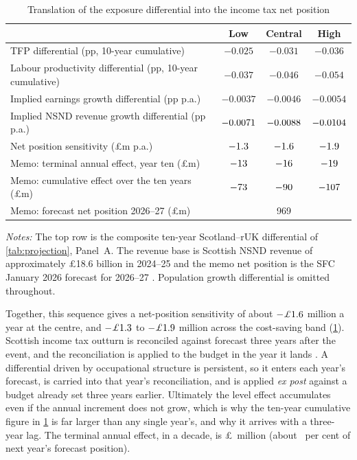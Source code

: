 \begin{table}[t]
\centering
\caption{Translation of the exposure differential into the income tax net position}
\label{tab:fiscal}
\small
\begin{tabular}{lccc}
\toprule
 & Low & Central & High \\
\midrule
TFP differential (pp, 10-year cumulative) &
  $-0.025$ & $-0.031$ & $-0.036$ \\
Labour productivity differential (pp, 10-year cumulative) &
  $-0.037$ & $-0.046$ & $-0.054$ \\
Implied earnings growth differential (pp p.a.) &
  $-0.0037$ & $-0.0046$ & $-0.0054$ \\
Implied NSND revenue growth differential (pp p.a.) &
  $-0.0071$ & $-0.0088$ & $-0.0104$ \\
Net position sensitivity (\pounds m p.a.) &
  $-1.3$ & $-1.6$ & $-1.9$ \\
Memo: terminal annual effect, year ten (\pounds m) &
  $-13$ & $-16$ & $-19$ \\
Memo: cumulative effect over the ten years (\pounds m) &
  $-73$ & $-90$ & $-107$ \\
Memo: forecast net position 2026--27 (\pounds m) &
  \multicolumn{3}{c}{969} \\
\bottomrule
\end{tabular}
\begin{minipage}{0.92\textwidth}
\vspace{0.4em}\footnotesize
\textit{Notes:} The top row is the composite ten-year Scotland--rUK differential of \cref{tab:projection}, Panel~A. The revenue base is Scottish NSND revenue of approximately \pounds18.6 billion in 2024--25 \citep{hmrcoutturn2025} and the memo net position is the SFC January 2026 forecast for 2026--27 \citep{sfc2026}. Population growth differential is omitted throughout.
\end{minipage}
\end{table}

Together, this sequence gives a net-position sensitivity of about $-\pounds\fiscCen$ million a year at the centre, and $-\pounds\fiscLo$ to $-\pounds\fiscHi$ million across the cost-saving band (\cref{tab:fiscal}). 
Scottish income tax outturn is reconciled against forecast three years after the event, and the reconciliation is applied to the budget in the year it lands \citep{gov2023}. A differential driven by occupational structure is persistent, so it enters each year's forecast, is carried into that year's reconciliation, and is applied \textit{ex post} against a budget already set three years earlier. Ultimately the level effect accumulates even if the annual increment does not grow, which is why the ten-year cumulative figure in \cref{tab:fiscal} is far larger than any single year's, and why it arrives with a three-year lag. The terminal annual effect, in a decade, is \pounds\termCen\ million (about \fiscPctTerm\ per cent of next year's forecast position).

